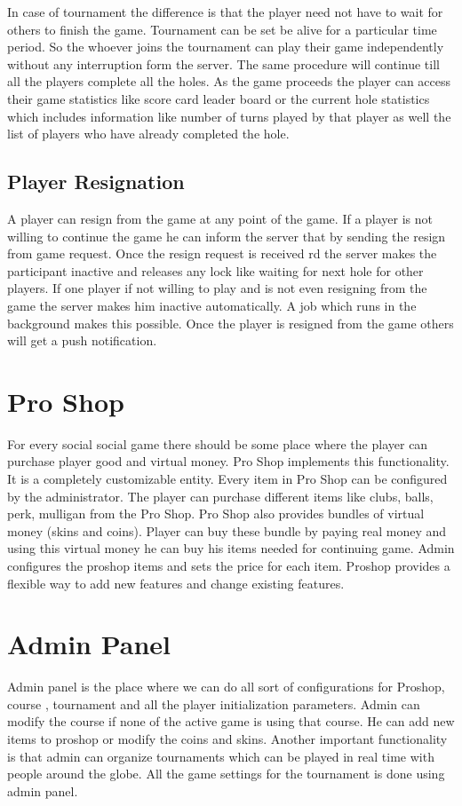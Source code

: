 \documentclass[12pt]{article}
\begin{document}
In case of tournament the difference is that the player need not have to wait for others to finish the game. Tournament can be set be alive for a particular time period. So the whoever joins the tournament can play their game independently without any interruption  form the server. 
The same procedure will continue till all the players complete all the holes. As the game proceeds the player can access their game statistics like score card leader board or the current hole statistics which includes information like number of turns played by that player as well the list of players who have already completed the hole.

\subsection{Player Resignation}
A player can resign from the game at any point of the game. If a player is not willing to continue the game he can inform the server that by sending the resign from game request. Once the resign request is received rd the server makes the participant inactive and releases any lock like waiting for next hole for other players. If one player if not willing to play and is not even resigning from the game the server makes him inactive automatically. A job which runs in the background makes this possible. Once the player is resigned from the game others will get a push notification.

\section{Pro Shop}
For every social social game there should be some place where the player can purchase player good and virtual money. Pro Shop implements this functionality. It is a completely customizable entity. Every item in Pro Shop can be configured by the administrator. The player can purchase different items like clubs, balls, perk, mulligan from the Pro Shop. Pro Shop also provides bundles of virtual money (skins and coins). Player can buy these bundle by paying real money and using this virtual money he can buy his items needed for continuing game. Admin configures the proshop items and sets the price for each item. Proshop provides a flexible way to add new features and change existing features.

\section{Admin Panel}
Admin panel is the place where we can do all sort of configurations for Proshop, course  , tournament and all the player  initialization parameters. Admin can modify the course if none of the active game is using that course. He can add new items to proshop or modify the coins and skins.
Another important functionality is that admin can organize tournaments which can be played in real time with people around the globe. All the game settings for the tournament is done using admin panel. 
\end{document}

